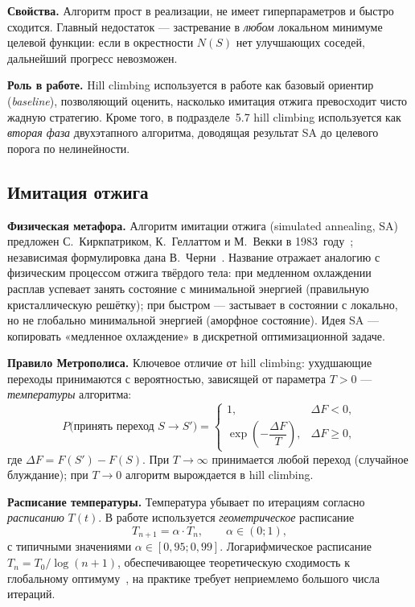\textbf{Свойства.} Алгоритм прост в реализации, не имеет
гиперпараметров и быстро сходится. Главный недостаток — застревание
в \emph{любом} локальном минимуме целевой функции: если в
окрестности $N(S)$ нет улучшающих соседей, дальнейший прогресс
невозможен.

\textbf{Роль в работе.} Hill climbing используется в работе как
базовый ориентир (\emph{baseline}), позволяющий оценить, насколько
имитация отжига превосходит чисто жадную стратегию. Кроме того,
в подразделе~5.7 hill climbing используется как \emph{вторая фаза}
двухэтапного алгоритма, доводящая результат SA до целевого порога
по нелинейности.

\subsection{Имитация отжига}

\textbf{Физическая метафора.} Алгоритм имитации отжига
(simulated annealing, SA) предложен С.~Киркпатриком, К.~Геллаттом
и М.~Векки в 1983~году~\cite{kirkpatrick1983sa}; независимая
формулировка дана В.~Черни~\cite{cerny1985sa}. Название отражает
аналогию с физическим процессом отжига твёрдого тела: при медленном
охлаждении расплав успевает занять состояние с минимальной
энергией (правильную кристаллическую решётку); при быстром —
застывает в состоянии с локально, но не глобально минимальной
энергией (аморфное состояние). Идея SA — копировать «медленное
охлаждение» в дискретной оптимизационной задаче.

\textbf{Правило Метрополиса.} Ключевое отличие от hill climbing:
ухудшающие переходы принимаются с вероятностью, зависящей от
параметра $T > 0$ — \emph{температуры} алгоритма:
\[
    P\bigl(\text{принять переход } S \to S'\bigr) =
    \begin{cases}
        1, & \Delta F < 0, \\
        \exp\!\left(-\dfrac{\Delta F}{T}\right), & \Delta F \geq 0,
    \end{cases}
\]
где $\Delta F = F(S') - F(S)$. При $T \to \infty$ принимается любой
переход (случайное блуждание); при $T \to 0$ алгоритм вырождается
в hill climbing.

\textbf{Расписание температуры.} Температура убывает по итерациям
согласно \emph{расписанию} $T(t)$. В работе используется
\emph{геометрическое} расписание
\[
    T_{n+1} = \alpha \cdot T_n, \qquad \alpha \in (0; 1),
\]
с типичными значениями $\alpha \in [0{,}95; 0{,}99]$. Логарифмическое
расписание $T_n = T_0 / \log(n+1)$, обеспечивающее теоретическую
сходимость к глобальному оптимуму~\cite{gemangeman1984sa},
на практике требует неприемлемо большого числа итераций.

